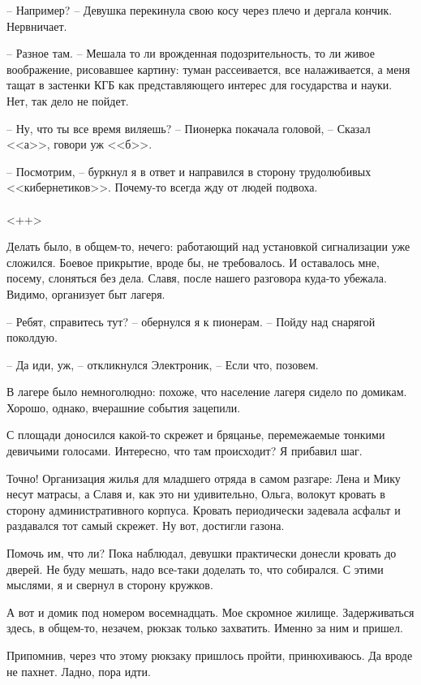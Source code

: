 \documentclass[a4paper]{book}
\begin{document}
-- Например? -- Девушка перекинула свою косу через плечо и дергала кончик. Нервничает.

-- Разное там. -- Мешала то ли врожденная подозрительность, то ли живое воображение, рисовавшее картину: туман рассеивается, все налаживается, а меня тащат в застенки КГБ как представляющего интерес для государства и науки. Нет, так дело не пойдет. 

-- Ну, что ты все время виляешь? -- Пионерка покачала головой, -- Сказал <<а>>, говори уж <<б>>.

-- Посмотрим, -- буркнул я в ответ и направился в сторону трудолюбивых <<кибернетиков>>. Почему-то всегда жду от людей подвоха.

\paragraph{}<++>

Делать было, в общем-то, нечего: работающий над установкой сигнализации уже сложился. Боевое прикрытие, вроде бы, не требовалось. И оставалось мне, посему, слоняться без дела. Славя, после нашего разговора куда-то убежала. Видимо, организует быт лагеря.

-- Ребят, справитесь тут? -- обернулся я к пионерам. -- Пойду над снарягой поколдую.

-- Да иди, уж, -- откликнулся Электроник, -- Если что, позовем. 

В лагере было немноголюдно: похоже, что население лагеря сидело по домикам. Хорошо, однако, вчерашние события зацепили. 

С площади доносился какой-то скрежет и бряцанье, перемежаемые тонкими девичьими голосами. Интересно, что там происходит? Я прибавил шаг.

Точно! Организация жилья для младшего отряда в самом разгаре: Лена и Мику несут матрасы, а Славя и, как это ни удивительно, Ольга, волокут кровать в сторону административного корпуса. Кровать периодически задевала асфальт и раздавался тот самый скрежет. Ну вот, достигли газона. 

Помочь им, что ли? Пока наблюдал, девушки практически донесли кровать до дверей. Не буду мешать, надо все-таки доделать то, что собирался.  С этими мыслями, я и свернул в сторону кружков.

А вот и домик под номером восемнадцать. Мое скромное жилище. Задерживаться здесь, в общем-то, незачем, рюкзак только захватить. Именно за ним и пришел.

Припомнив, через что этому рюкзаку пришлось пройти, принюхиваюсь. Да вроде не пахнет. Ладно, пора идти. 
\end{document}
